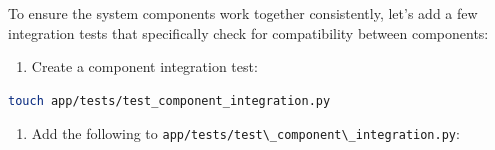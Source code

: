 \documentclass[
  screen,review,acmlarge]{acmart}
\newcommand{\passthrough}[1]{#1}
\providecommand{\tightlist}{%
  \setlength{\itemsep}{0pt}\setlength{\parskip}{0pt}}
\begin{document}
To ensure the system components work together consistently, let's add a few integration tests that specifically check for compatibility between components:

\begin{enumerate}
\def\labelenumi{\arabic{enumi}.}
\tightlist
\item
  Create a component integration test:
\end{enumerate}

\begin{lstlisting}[language=bash]
touch app/tests/test_component_integration.py
\end{lstlisting}

\begin{enumerate}
\def\labelenumi{\arabic{enumi}.}
\setcounter{enumi}{1}
\tightlist
\item
  Add the following to \passthrough{\lstinline!app/tests/test\_component\_integration.py!}:
\end{enumerate}
\end{document}
